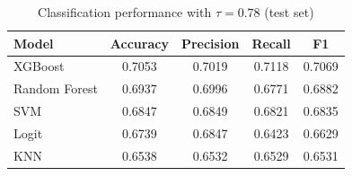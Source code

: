 \begin{table}
\caption{Classification performance with $\tau = 0.78$ (test set)}
\label{tab:clf_performance}
\begin{tabular}{lcccc}
\toprule
Model & Accuracy & Precision & Recall & F1 \\
\midrule
XGBoost & 0.7053 & 0.7019 & 0.7118 & 0.7069 \\
Random Forest & 0.6937 & 0.6996 & 0.6771 & 0.6882 \\
SVM & 0.6847 & 0.6849 & 0.6821 & 0.6835 \\
Logit & 0.6739 & 0.6847 & 0.6423 & 0.6629 \\
KNN & 0.6538 & 0.6532 & 0.6529 & 0.6531 \\
\bottomrule
\end{tabular}
\end{table}
